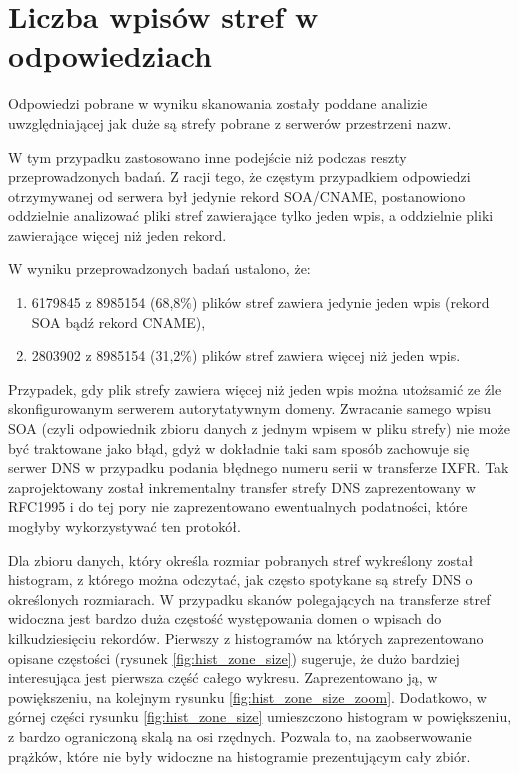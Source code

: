 \section{Liczba wpisów stref w odpowiedziach}
\noindent Odpowiedzi pobrane w wyniku skanowania zostały poddane analizie uwzględniającej jak duże są strefy pobrane z serwerów przestrzeni nazw.

W tym przypadku zastosowano inne podejście niż podczas reszty przeprowadzonych badań. Z racji tego, że częstym przypadkiem odpowiedzi
otrzymywanej od serwera był jedynie rekord SOA/CNAME, postanowiono oddzielnie analizować pliki stref zawierające tylko jeden wpis, a
oddzielnie pliki zawierające więcej niż jeden rekord.

W wyniku przeprowadzonych badań ustalono, że:
\begin{enumerate}
	\item 6179845 z 8985154 (68,8\%) plików stref zawiera jedynie jeden wpis (rekord SOA bądź rekord CNAME),
	\item 2803902 z 8985154 (31,2\%) plików stref zawiera więcej niż jeden wpis.
\end{enumerate}
Przypadek, gdy plik strefy zawiera więcej niż jeden wpis można utożsamić ze źle skonfigurowanym serwerem autorytatywnym domeny.
Zwracanie samego wpisu SOA (czyli odpowiednik zbioru danych z jednym wpisem w pliku strefy) nie może być traktowane jako błąd,
gdyż w dokładnie taki sam sposób zachowuje się serwer DNS w przypadku podania błędnego numeru serii w transferze IXFR. Tak
zaprojektowany został inkrementalny transfer strefy DNS zaprezentowany w RFC1995 \cite{RFC1995} i do tej pory nie zaprezentowano
ewentualnych podatności, które mogłyby wykorzystywać ten protokół.

Dla zbioru danych, który określa rozmiar pobranych stref wykreślony został histogram, z którego można odczytać, jak często spotykane
są strefy DNS o określonych rozmiarach. W przypadku skanów polegających na transferze stref widoczna jest bardzo duża częstość
występowania domen o wpisach do kilkudziesięciu rekordów. Pierwszy z histogramów na których zaprezentowano opisane częstości
(rysunek \ref{fig:hist_zone_size}) sugeruje, że dużo bardziej interesująca jest pierwsza część całego wykresu. Zaprezentowano ją,
w powiększeniu, na kolejnym rysunku \ref{fig:hist_zone_size_zoom}. Dodatkowo, w górnej części rysunku \ref{fig:hist_zone_size}
umieszczono histogram w powiększeniu, z bardzo ograniczoną skalą na osi rzędnych. Pozwala to, na zaobserwowanie prążków, które
nie były widoczne na histogramie prezentującym cały zbiór.

